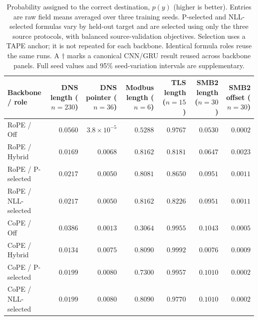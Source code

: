 \begin{table}[tb]
\centering
\small
\setlength{\tabcolsep}{5pt}
\caption{Probability assigned to the correct destination, $p(y)$ (higher is better). Entries are raw field means averaged over three training seeds. P-selected and NLL-selected formulas vary by held-out target and are selected using only the three source protocols, with balanced source-validation objectives. Selection uses a TAPE anchor; it is not repeated for each backbone. Identical formula roles reuse the same runs. A $\dagger$ marks a canonical CNN/GRU result reused across backbone panels. Full seed values and 95\% seed-variation intervals are supplementary.}
\label{tab:lapa-v17-ptrue}
\begin{tabular}{l*{6}{r}}
\toprule
Backbone / role & \shortstack{DNS\\length\\($n=230$)} & \shortstack{DNS\\pointer\\($n=36$)} & \shortstack{Modbus\\length\\($n=6$)} & \shortstack{TLS\\length\\($n=15$)} & \shortstack{SMB2\\length\\($n=30$)} & \shortstack{SMB2\\offset\\($n=30$)} \\
\midrule
RoPE / Off & $0.0560$ & $3.8\!\times\!10^{-5}$ & $0.5288$ & $0.9767$ & $0.0530$ & $0.0002$ \\
RoPE / Hybrid & $0.0169$ & $0.0068$ & $0.8162$ & $0.8181$ & $0.0647$ & $0.0023$ \\
RoPE / P-selected & $0.0217$ & $0.0050$ & $0.8081$ & $0.8650$ & $0.0951$ & $0.0011$ \\
RoPE / NLL-selected & $0.0217$ & $0.0050$ & $0.8162$ & $0.8226$ & $0.0951$ & $0.0011$ \\
\addlinespace[3pt]
CoPE / Off & $0.0386$ & $0.0013$ & $0.3064$ & $0.9955$ & $0.1043$ & $0.0005$ \\
CoPE / Hybrid & $0.0134$ & $0.0075$ & $0.8090$ & $0.9992$ & $0.0076$ & $0.0009$ \\
CoPE / P-selected & $0.0199$ & $0.0080$ & $0.7300$ & $0.9957$ & $0.1010$ & $0.0002$ \\
CoPE / NLL-selected & $0.0199$ & $0.0080$ & $0.8090$ & $0.9770$ & $0.1010$ & $0.0002$ \\

\end{tabular}
\end{table}

